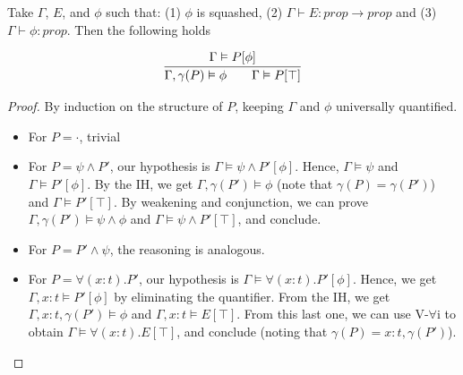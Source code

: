 \begin{theorem}
    Take $\Gamma$, $E$, and $\phi$ such that:
    (1) $\phi$ is squashed,
    (2) $\Gamma \vdash E : prop \rightarrow prop$
    and (3) $\Gamma \vdash \phi : prop$.
    Then the following holds

    \[
        \infer{\Gamma, \gamma(P) \vDash \phi \qquad \Gamma \vDash P[\top]}
              {\Gamma \vDash P[\phi]}
    \]
\end{theorem}
\begin{proof}
    By induction on the structure of $P$, keeping $\Gamma$ and $\phi$
    universally quantified.
    \begin{itemize}
        \item For $P = \cdot$, trivial
        \item For $P = \psi \land P'$, our hypothesis is
              $\Gamma \vDash \psi \land P'[\phi]$.
              Hence,
              $\Gamma \vDash \psi$ and
              $\Gamma \vDash P'[\phi]$.
              By the IH, we get
              $\Gamma, \gamma(P') \vDash \phi$
              (note that $\gamma(P) = \gamma(P')$)
              and
              $\Gamma \vDash P'[\top]$.
              By weakening and conjunction, 
              we can prove $\Gamma, \gamma(P') \vDash \psi \land \phi$
              and $\Gamma \vDash \psi \land P'[\top]$, and conclude.

        \item For $P = P' \land \psi$, the reasoning is analogous.

        \item For $P = \forall (x:t). P'$, our hypothesis is
              $\Gamma \vDash \forall (x:t). P'[\phi]$. Hence,
              we get $\Gamma, x:t \vDash P'[\phi]$ by
              eliminating the quantifier.
              From the IH, we get
              $\Gamma, x:t, \gamma(P') \vDash \phi$
              and
              $\Gamma, x:t \vDash E[\top]$.
              From this last one, we can use V-$\forall$i to
              obtain $\Gamma \vDash \forall (x:t). E[\top]$, and conclude
              (noting that $\gamma(P) = x:t, \gamma(P')$).
    \end{itemize}
\end{proof}
